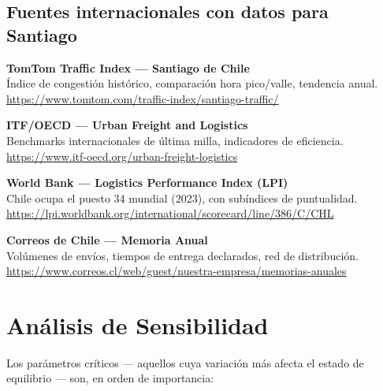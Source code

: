 \documentclass[12pt,a4paper]{article}
\begin{document}
\subsection{Fuentes internacionales con datos para Santiago}

\begin{enumerate}[leftmargin=1.5cm,label=\textbf{[\arabic*]},resume]

\item \textbf{TomTom Traffic Index — Santiago de Chile}\\
  Índice de congestión histórico, comparación hora pico/valle, tendencia anual.\\
  \url{https://www.tomtom.com/traffic-index/santiago-traffic/}

\item \textbf{ITF/OECD — Urban Freight and Logistics}\\
  Benchmarks internacionales de última milla, indicadores de eficiencia.\\
  \url{https://www.itf-oecd.org/urban-freight-logistics}

\item \textbf{World Bank — Logistics Performance Index (LPI)}\\
  Chile ocupa el puesto 34 mundial (2023), con subíndices de puntualidad.\\
  \url{https://lpi.worldbank.org/international/scorecard/line/386/C/CHL}

\item \textbf{Correos de Chile — Memoria Anual}\\
  Volúmenes de envíos, tiempos de entrega declarados, red de distribución.\\
  \url{https://www.correos.cl/web/guest/nuestra-empresa/memorias-anuales}

\end{enumerate}

\section{Análisis de Sensibilidad}

Los parámetros críticos — aquellos cuya variación más afecta el
estado de equilibrio — son, en orden de importancia:
\end{document}
